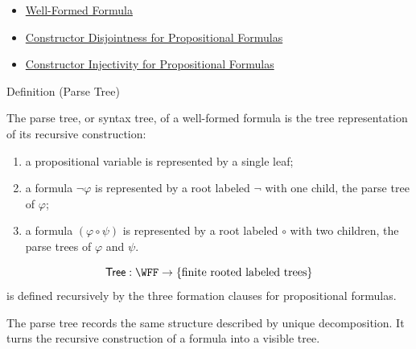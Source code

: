 \begin{dependencies}
\begin{itemize}
  \item \hyperref[def:well-formed-formula]{Well-Formed Formula}
  \item \hyperref[lem:constructor-disjointness-propositional-formulas]{Constructor Disjointness for Propositional Formulas}
  \item \hyperref[lem:constructor-injectivity-propositional-formulas]{Constructor Injectivity for Propositional Formulas}
\end{itemize}
\end{dependencies}
\begin{definitionbox}{Definition (Parse Tree)}
\begin{definition}
\label{def:parse-tree-propositional-logic}
The parse tree, or syntax tree, of a well-formed formula is the tree representation of its recursive construction:
\begin{enumerate}
\item a propositional variable is represented by a single leaf;
\item a formula \(\neg\varphi\) is represented by a root labeled \(\neg\) with one child, the parse tree of \(\varphi\);
\item a formula \((\varphi\circ\psi)\) is represented by a root labeled \(\circ\) with two children, the parse trees of \(\varphi\) and \(\psi\).
\end{enumerate}
\end{definition}
\end{definitionbox}

\begin{remark*}
\[
\mathsf{Tree}:\WFF\to\{\text{finite rooted labeled trees}\}
\]
is defined recursively by the three formation clauses for propositional formulas.
\end{remark*}

\begin{remark*}[Interpretation]
The parse tree records the same structure described by unique decomposition. It turns the recursive construction of a formula into a visible tree.
\end{remark*}

